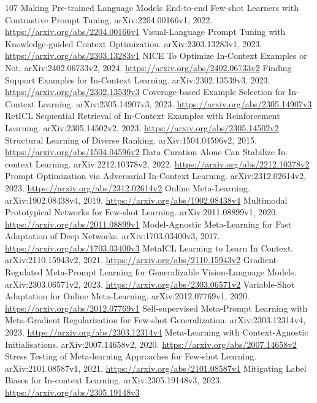 \documentclass[11pt]{article}
\begin{document}
\begin{thebibliography}{107}
 Making Pre-trained Language Models End-to-end Few-shot Learners with Contrastive Prompt Tuning. arXiv:2204.00166v1, 2022. \url{https://arxiv.org/abs/2204.00166v1}
 Visual-Language Prompt Tuning with Knowledge-guided Context Optimization. arXiv:2303.13283v1, 2023. \url{https://arxiv.org/abs/2303.13283v1}
 NICE To Optimize In-Context Examples or Not. arXiv:2402.06733v2, 2024. \url{https://arxiv.org/abs/2402.06733v2}
 Finding Support Examples for In-Context Learning. arXiv:2302.13539v3, 2023. \url{https://arxiv.org/abs/2302.13539v3}
 Coverage-based Example Selection for In-Context Learning. arXiv:2305.14907v3, 2023. \url{https://arxiv.org/abs/2305.14907v3}
 RetICL Sequential Retrieval of In-Context Examples with Reinforcement Learning. arXiv:2305.14502v2, 2023. \url{https://arxiv.org/abs/2305.14502v2}
 Structural Learning of Diverse Ranking. arXiv:1504.04596v2, 2015. \url{https://arxiv.org/abs/1504.04596v2}
 Data Curation Alone Can Stabilize In-context Learning. arXiv:2212.10378v2, 2022. \url{https://arxiv.org/abs/2212.10378v2}
 Prompt Optimization via Adversarial In-Context Learning. arXiv:2312.02614v2, 2023. \url{https://arxiv.org/abs/2312.02614v2}
 Online Meta-Learning. arXiv:1902.08438v4, 2019. \url{https://arxiv.org/abs/1902.08438v4}
 Multimodal Prototypical Networks for Few-shot Learning. arXiv:2011.08899v1, 2020. \url{https://arxiv.org/abs/2011.08899v1}
 Model-Agnostic Meta-Learning for Fast Adaptation of Deep Networks. arXiv:1703.03400v3, 2017. \url{https://arxiv.org/abs/1703.03400v3}
 MetaICL Learning to Learn In Context. arXiv:2110.15943v2, 2021. \url{https://arxiv.org/abs/2110.15943v2}
 Gradient-Regulated Meta-Prompt Learning for Generalizable Vision-Language Models. arXiv:2303.06571v2, 2023. \url{https://arxiv.org/abs/2303.06571v2}
 Variable-Shot Adaptation for Online Meta-Learning. arXiv:2012.07769v1, 2020. \url{https://arxiv.org/abs/2012.07769v1}
 Self-supervised Meta-Prompt Learning with Meta-Gradient Regularization for Few-shot Generalization. arXiv:2303.12314v4, 2023. \url{https://arxiv.org/abs/2303.12314v4}
 Meta-Learning with Context-Agnostic Initialisations. arXiv:2007.14658v2, 2020. \url{https://arxiv.org/abs/2007.14658v2}
 Stress Testing of Meta-learning Approaches for Few-shot Learning. arXiv:2101.08587v1, 2021. \url{https://arxiv.org/abs/2101.08587v1}
 Mitigating Label Biases for In-context Learning. arXiv:2305.19148v3, 2023. \url{https://arxiv.org/abs/2305.19148v3}

\end{thebibliography}
\end{document}
